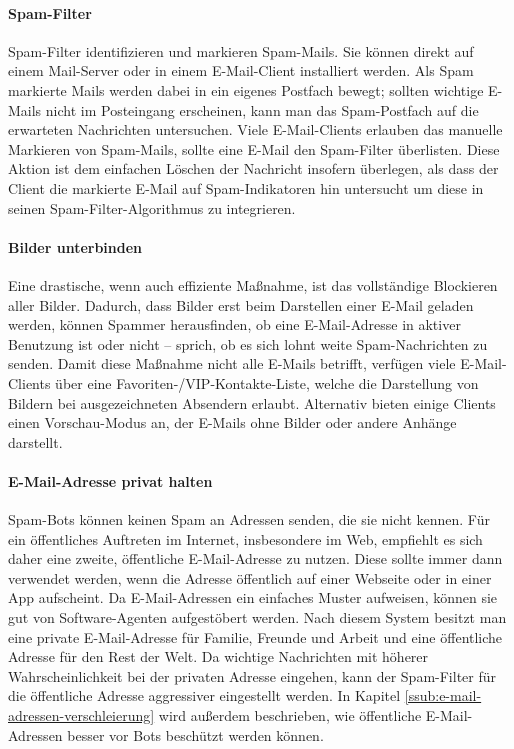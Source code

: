 \paragraph{Spam-Filter}
\label{par:spam-filter}

Spam-Filter identifizieren und markieren Spam-Mails. Sie können direkt auf
einem Mail-Server oder in einem E-Mail-Client installiert werden. Als Spam
markierte Mails werden dabei in ein eigenes Postfach bewegt; sollten wichtige
E-Mails nicht im Posteingang erscheinen, kann man das Spam-Postfach auf die
erwarteten Nachrichten untersuchen. Viele E-Mail-Clients erlauben das manuelle
Markieren von Spam-Mails, sollte eine E-Mail den Spam-Filter überlisten. Diese
Aktion ist dem einfachen Löschen der Nachricht insofern überlegen, als dass der
Client die markierte E-Mail auf Spam-Indikatoren hin untersucht um diese in
seinen Spam-Filter-Algorithmus zu integrieren.

\paragraph{Bilder unterbinden}
\label{par:bilder-unterbinden}

Eine drastische, wenn auch effiziente Maßnahme, ist das vollständige Blockieren
aller Bilder. Dadurch, dass Bilder erst beim Darstellen einer E-Mail geladen
werden, können Spammer herausfinden, ob eine E-Mail-Adresse in aktiver
Benutzung ist oder nicht -- sprich, ob es sich lohnt weite Spam-Nachrichten zu
senden. Damit diese Maßnahme nicht alle E-Mails betrifft, verfügen viele
E-Mail-Clients über eine Favoriten-/VIP-Kontakte-Liste, welche die Darstellung
von Bildern bei ausgezeichneten Absendern erlaubt. Alternativ bieten einige
Clients einen Vorschau-Modus an, der E-Mails ohne Bilder oder andere Anhänge
darstellt.

\paragraph{E-Mail-Adresse privat halten}
\label{par:e-mail-adresse-privat-halten}

Spam-Bots können keinen Spam an Adressen senden, die sie nicht kennen. Für ein
öffentliches Auftreten im Internet, insbesondere im Web, empfiehlt es sich
daher eine zweite, öffentliche E-Mail-Adresse zu nutzen. Diese sollte immer
dann verwendet werden, wenn die Adresse öffentlich auf einer Webseite oder in
einer App aufscheint. Da E-Mail-Adressen ein einfaches Muster aufweisen, können
sie gut von Software-Agenten aufgestöbert werden. Nach diesem System besitzt
man eine private E-Mail-Adresse für Familie, Freunde und Arbeit und eine
öffentliche Adresse für den Rest der Welt. Da wichtige Nachrichten mit höherer
Wahrscheinlichkeit bei der privaten Adresse eingehen, kann der Spam-Filter für
die öffentliche Adresse aggressiver eingestellt werden. In Kapitel
\ref{ssub:e-mail-adressen-verschleierung} wird außerdem beschrieben, wie
öffentliche E-Mail-Adressen besser vor Bots beschützt werden können.

